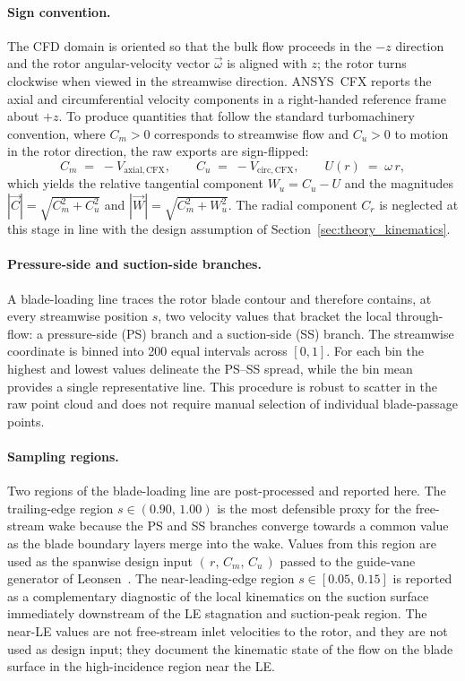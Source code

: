\paragraph{Sign convention.}
The CFD domain is oriented so that the bulk flow proceeds in the $-z$ direction and the rotor angular-velocity vector $\vec{\omega}$ is aligned with $z$; the rotor turns clockwise when viewed in the streamwise direction. ANSYS~CFX reports the axial and circumferential velocity components in a right-handed reference frame about $+z$. To produce quantities that follow the standard turbomachinery convention, where $C_m>0$ corresponds to streamwise flow and $C_u>0$ to motion in the rotor direction, the raw exports are sign-flipped:
\begin{equation}
C_m \;=\; -V_{\mathrm{axial},\mathrm{CFX}}, \qquad
C_u \;=\; -V_{\mathrm{circ},\mathrm{CFX}}, \qquad
U(r) \;=\; \omega\,r,
\label{eq:rdt_sign_convention}
\end{equation}
which yields the relative tangential component $W_u = C_u - U$ and the magnitudes $|\vec{C}|=\sqrt{C_m^{2}+C_u^{2}}$ and $|\vec{W}|=\sqrt{C_m^{2}+W_u^{2}}$. The radial component $C_r$ is neglected at this stage in line with the design assumption of Section~\ref{sec:theory_kinematics}.
 
\paragraph{Pressure-side and suction-side branches.}
A blade-loading line traces the rotor blade contour and therefore contains, at every streamwise position $s$, two velocity values that bracket the local through-flow: a pressure-side (PS) branch and a suction-side (SS) branch. The streamwise coordinate is binned into 200 equal intervals across $[0,1]$. For each bin the highest and lowest values delineate the PS--SS spread, while the bin mean provides a single representative line. This procedure is robust to scatter in the raw point cloud and does not require manual selection of individual blade-passage points.
 
\paragraph{Sampling regions.}
Two regions of the blade-loading line are post-processed and reported here. The trailing-edge region $s\in(0.90,\,1.00)$ is the most defensible proxy for the free-stream wake because the PS and SS branches converge towards a common value as the blade boundary layers merge into the wake. Values from this region are used as the spanwise design input $(\,r,\,C_m,\,C_u\,)$ passed to the guide-vane generator of Leonsen~\cite{Leonsen2025}. The near-leading-edge region $s\in[0.05,\,0.15]$ is reported as a complementary diagnostic of the local kinematics on the suction surface immediately downstream of the LE stagnation and suction-peak region. The near-LE values are not free-stream inlet velocities to the rotor, and they are not used as design input; they document the kinematic state of the flow on the blade surface in the high-incidence region near the LE.
 

